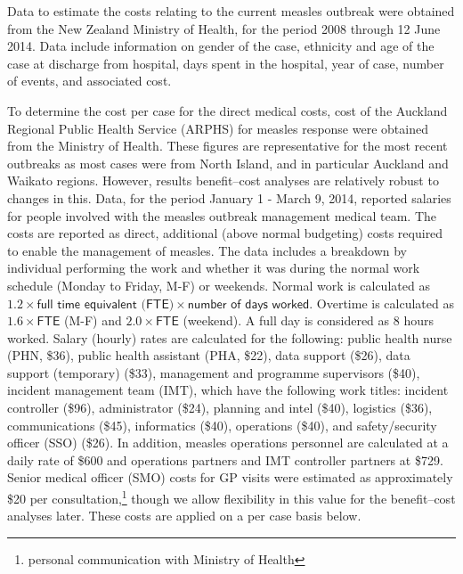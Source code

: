 \documentclass{article}
\begin{document}
Data to estimate the costs relating to the current measles outbreak were obtained from the New Zealand Ministry of Health, for the period 2008 through 12 June 2014. Data include information on gender of the case, ethnicity and age of the case at discharge from hospital, days spent in the hospital, year of case, number of events, and associated cost.

To determine the cost per case for the direct medical costs, cost of the Auckland Regional Public Health Service (ARPHS) for measles response were obtained from the Ministry of Health. These figures are representative for the most recent outbreaks as most cases were from North Island, and in particular Auckland and Waikato regions. However, results benefit--cost analyses are relatively robust to changes in this. Data, for the period January 1 - March 9, 2014, reported salaries for people involved with the measles outbreak management medical team. The costs are reported as direct, additional (above normal budgeting) costs required to enable the management of measles. The data includes a breakdown by individual performing the work and whether it was during the normal work schedule (Monday to Friday, M-F) or weekends. Normal work is calculated as $1.2 \times \textsf{full time equivalent (FTE)} \times \textsf{number of days worked}$. Overtime is calculated as $1.6\times\textsf{FTE}$ (M-F) and $2.0 \times \textsf{FTE}$ (weekend). A full day is considered as 8 hours worked. Salary (hourly) rates are calculated for the following: public health nurse (PHN, \$36), public health assistant (PHA, \$22), data support (\$26), data support (temporary) (\$33), management and programme supervisors (\$40), incident management team (IMT), which have the following work titles: incident controller (\$96), administrator (\$24), planning and intel (\$40), logistics (\$36), communications (\$45), informatics (\$40), operations (\$40), and safety/security officer (SSO) (\$26). In addition, measles operations personnel are calculated at a daily rate of \$600 and operations partners and IMT controller partners at \$729. Senior medical officer (SMO) costs for GP visits were estimated as approximately \$20 per consultation,\footnote{personal communication with Ministry of Health} though we allow flexibility in this value for the benefit--cost analyses later. These costs are applied on a per case basis below.
\end{document}
